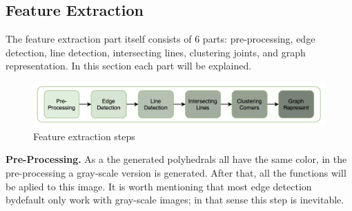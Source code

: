 \documentclass[crop=false]{standalone}
\begin{document}
\subsection{Feature Extraction \label{subsection:observation}}
\noindent The feature extraction part itself consists of 6 parts: pre-processing, edge detection, line detection, intersecting lines, clustering joints, and graph representation. In this section each part will be explained.
\begin{figure}[t]
\centering{}\includegraphics[width=0.95\columnwidth]{figure/features.png}
\caption{\label{fig:features} Feature extraction steps}
\end{figure}

\noindent \textbf{Pre-Processing.} As a the generated polyhedrals all have the same color, in the pre-processing a gray-scale version is generated. After that, all the functions will be aplied to this image. It is worth mentioning that most edge detection bydefault only work with gray-scale images; in that sense this step is inevitable.
\\
\end{document}
